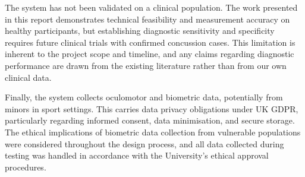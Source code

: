 The system has not been validated on a clinical  population. The work presented in this report demonstrates technical feasibility and measurement accuracy on healthy participants, but establishing diagnostic sensitivity and specificity requires future clinical trials with confirmed concussion cases. This limitation is inherent to the project scope and timeline, and any claims regarding diagnostic performance are drawn from the existing literature rather than from our own clinical data.

Finally, the system collects oculomotor and biometric data, potentially from minors in sport settings. This carries data privacy obligations under UK GDPR, particularly regarding informed consent, data minimisation, and secure storage. The ethical implications of biometric data collection from vulnerable populations were considered throughout the design process, and all data collected during testing was handled in accordance with the University's ethical approval procedures. 
